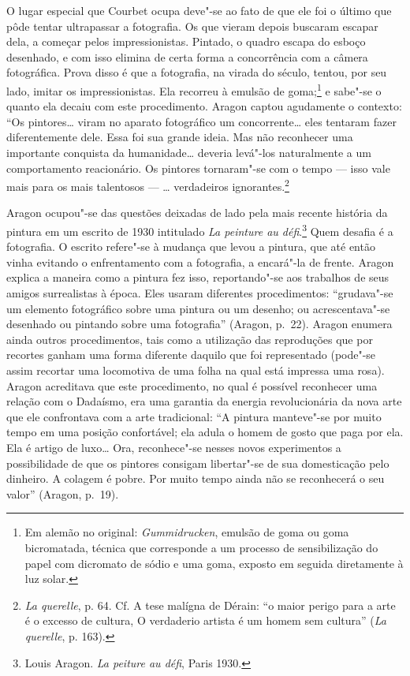 O lugar especial que Courbet ocupa deve"-se ao fato de que ele foi o
último que pôde tentar ultrapassar a fotografia. Os que vieram depois buscaram
escapar dela, a começar pelos impressionistas. Pintado, o quadro escapa
do esboço desenhado, e com isso elimina de certa forma a
concorrência com a câmera fotográfica. Prova disso é que a fotografia, na
virada do século, tentou, por seu lado, imitar os impressionistas. Ela
recorreu à emulsão de goma;\footnote{Em alemão no original:
  \emph{Gummidrucken}, emulsão de goma ou goma bicromatada, técnica que
  corresponde a um processo de sensibilização do papel com dicromato de
  sódio e uma goma, exposto em seguida diretamente à luz solar. \versal{[N. T.]}} e
sabe"-se o quanto ela decaiu com este procedimento. Aragon captou
agudamente o contexto: ``Os pintores\ldots{} viram no aparato fotográfico um
concorrente\ldots{} eles tentaram fazer diferentemente dele. Essa foi sua
grande ideia. Mas não reconhecer uma importante conquista da humanidade\ldots{} deveria levá"-los naturalmente a um comportamento reacionário. Os
pintores tornaram"-se com o tempo --- isso vale mais para os mais
talentosos --- \ldots{} verdadeiros ignorantes.\footnote{\emph{La querelle}, p.
  64. Cf. A tese malígna de Dérain: ``o maior perigo para a arte é o
  excesso de cultura, O verdaderio artista é um homem sem cultura''
  (\emph{La querelle}, p. 163).}

Aragon ocupou"-se das questões deixadas de lado pela mais recente história da
pintura em um escrito de 1930 intitulado \emph{La peinture au
défi}.\footnote{Louis Aragon. \emph{La peiture au défi}, Paris 1930.}
Quem desafia é a fotografia. O escrito refere"-se à mudança que levou a
pintura, que até então vinha evitando o enfrentamento com a fotografia, a
encará"-la de frente. Aragon explica a maneira como a pintura fez isso,
reportando"-se aos trabalhos de seus amigos surrealistas à época. Eles usaram
diferentes procedimentos: ``grudava"-se um elemento fotográfico sobre uma
pintura ou um desenho; ou acrescentava"-se desenhado ou pintando sobre uma
fotografia'' (Aragon, p.~22). Aragon enumera ainda outros
procedimentos, tais como a utilização das reproduções que por recortes
ganham uma forma diferente daquilo que foi representado (pode"-se assim
recortar uma locomotiva de uma folha na qual está impressa uma rosa).
Aragon acreditava que este procedimento, no qual é possível reconhecer uma
relação com o Dadaísmo, era uma garantia da energia revolucionária
da nova arte que ele confrontava com a arte tradicional: ``A pintura
manteve"-se por muito tempo em uma posição confortável; ela adula o homem de gosto
que paga por ela. Ela é artigo de luxo\ldots{} Ora,
reconhece"-se nesses novos experimentos a possibilidade de que os pintores
consigam libertar"-se de sua domesticação pelo dinheiro. A
colagem é pobre. Por muito tempo ainda não se reconhecerá o seu valor'' (Aragon, p.~19).

